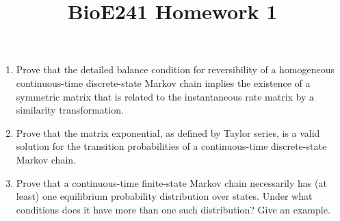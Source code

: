 \documentclass[10pt]{article}
\begin{document}
\title{BioE241 Homework 1}
\date{}
\maketitle


\begin{enumerate}
\item Prove that the detailed balance condition for reversibility of a homogeneous continuous-time discrete-state Markov chain implies the existence of a symmetric matrix that is related to the instantaneous rate matrix by a similarity transformation.
\item Prove that the matrix exponential, as defined by Taylor series, is a valid solution for the transition probabilities of a continuous-time discrete-state Markov chain.
\item Prove that a continuous-time finite-state Markov chain necessarily has (at least) one equilibrium probability distribution over states. Under what conditions does it have more than one such distribution? Give an example.
\end{enumerate}
\end{document}
